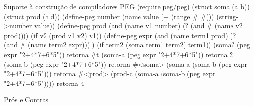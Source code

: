 \documentclass{beamer}
\begin{document}


\begin{frame}{Suporte à construção de compiladores}
PEG
(require peg/peg)
(struct soma (a b))
(struct prod (c d))
(define-peg number
            (name value (+ (range #\0 #\9)))
            (string->number value))
(define-peg prod
            (and (name v1 number) (? (and #\* (name v2 prod))))
            (if v2 (prod v1 v2) v1))
(define-peg expr
            (and (name term1 prod) (? (and #\+ (name term2 expr))) )
            (if term2 (soma term1 term2) term1))
 (soma? (peg expr "2+4*7+6*5"))     retorna #t
 (soma-a (peg expr "2+4*7+6*5"))    retorna 2
 (soma-b (peg expr "2+4*7+6*5"))    retorna #<soma>
 (soma-a (soma-b (peg expr "2+4*7+6*5"))) retorna #<prod>
 (prod-c (soma-a (soma-b (peg expr "2+4*7+6*5"))))  retorna 4
\end{frame}


\begin{frame}{Prós e Contras}

\end{frame}
\end{document}
